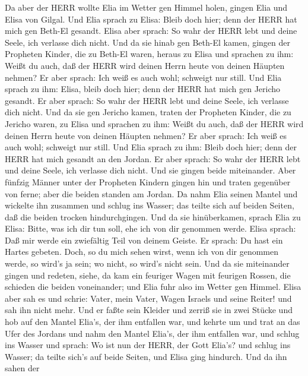  Da aber der HERR wollte Elia im Wetter gen Himmel holen,
gingen Elia und Elisa von Gilgal.  Und Elia sprach zu Elisa:
Bleib doch hier; denn der HERR hat mich gen Beth-El gesandt. Elisa aber
sprach: So wahr der HERR lebt und deine Seele, ich verlasse dich nicht.
Und da sie hinab gen Beth-El kamen,  gingen der Propheten
Kinder, die zu Beth-El waren, heraus zu Elisa und sprachen zu ihm: Weißt
du auch, daß der HERR wird deinen Herrn heute von deinen Häupten nehmen?
Er aber sprach: Ich weiß es auch wohl; schweigt nur still. 
Und Elia sprach zu ihm: Elisa, bleib doch hier; denn der HERR hat mich
gen Jericho gesandt. Er aber sprach: So wahr der HERR lebt und deine
Seele, ich verlasse dich nicht. Und da sie gen Jericho kamen,
 traten der Propheten Kinder, die zu Jericho waren, zu Elisa
und sprachen zu ihm: Weißt du auch, daß der HERR wird deinen Herrn heute
von deinen Häupten nehmen? Er aber sprach: Ich weiß es auch wohl;
schweigt nur still.  Und Elia sprach zu ihm: Bleib doch
hier; denn der HERR hat mich gesandt an den Jordan. Er aber sprach: So
wahr der HERR lebt und deine Seele, ich verlasse dich nicht. Und sie
gingen beide miteinander.  Aber fünfzig Männer unter der
Propheten Kindern gingen hin und traten gegenüber von ferne; aber die
beiden standen am Jordan.  Da nahm Elia seinen Mantel und
wickelte ihn zusammen und schlug ins Wasser; das teilte sich auf beiden
Seiten, daß die beiden trocken hindurchgingen.  Und da sie
hinüberkamen, sprach Elia zu Elisa: Bitte, was ich dir tun soll, ehe ich
von dir genommen werde. Elisa sprach: Daß mir werde ein zwiefältig Teil
von deinem Geiste.  Er sprach: Du hast ein Hartes gebeten.
Doch, so du mich sehen wirst, wenn ich von dir genommen werde, so wird's
ja sein; wo nicht, so wird's nicht sein.  Und da sie
miteinander gingen und redeten, siehe, da kam ein feuriger Wagen mit
feurigen Rossen, die schieden die beiden voneinander; und Elia fuhr also
im Wetter gen Himmel.  Elisa aber sah es und schrie: Vater,
mein Vater, Wagen Israels und seine Reiter! und sah ihn nicht mehr. Und
er faßte sein Kleider und zerriß sie in zwei Stücke  und
hob auf den Mantel Elia's, der ihm entfallen war, und kehrte um und trat
an das Ufer des Jordans  und nahm den Mantel Elia's, der
ihm entfallen war, und schlug ins Wasser und sprach: Wo ist nun der
HERR, der Gott Elia's? und schlug ins Wasser; da teilte sich's auf beide
Seiten, und Elisa ging hindurch.  Und da ihn sahen der
